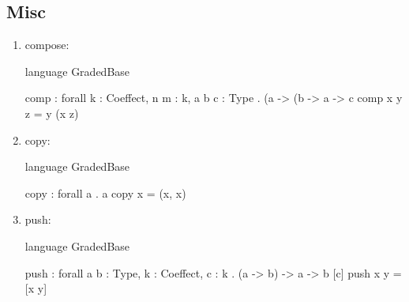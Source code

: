 \subsection{Misc}
\begin{enumerate}
\item compose: 
\begin{granule}
language GradedBase

comp : forall {k : Coeffect, n m : k, a b c : Type} 
     . (a %
     -> (b %
     -> a %
     -> c
comp x y z = y (x z)
\end{granule}
\item copy: 
\begin{granule}
language GradedBase

copy : forall a . a %
copy x = (x, x)
\end{granule}
\item push:
\begin{granule}
language GradedBase

push : forall {a b : Type, k : Coeffect, c : k} 
     . (a -> b) %
     -> a %
     -> b [c]
push x y = [x y]
\end{granule}
\end{enumerate}